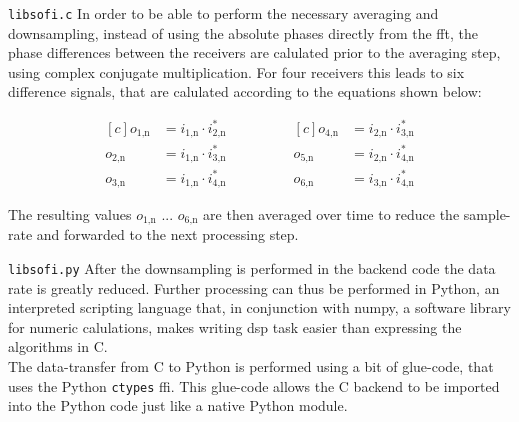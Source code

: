 \begin{subchapter}{\texttt{libsofi.c}}
  In order to be able to perform the necessary averaging
  and downsampling, instead of using the absolute phases
  directly from the \gls{fft}, the phase differences between the receivers
  are calulated prior to the averaging step, using complex conjugate multiplication.
  For four receivers this leads to six difference signals,
  that are calulated according to the equations shown below:

  \begin{equation*}
    \begin{aligned}[c]
      o_\text{1,n}&= i_\text{1,n} \cdot i_\text{2,n}^{\ast} \\
      o_\text{2,n}&= i_\text{1,n} \cdot i_\text{3,n}^{\ast} \\
      o_\text{3,n}&= i_\text{1,n} \cdot i_\text{4,n}^{\ast}
    \end{aligned}
    \qquad \qquad
    \begin{aligned}[c]
      o_\text{4,n}&= i_\text{2,n} \cdot i_\text{3,n}^{\ast} \\
      o_\text{5,n}&= i_\text{2,n} \cdot i_\text{4,n}^{\ast} \\
      o_\text{6,n}&= i_\text{3,n} \cdot i_\text{4,n}^{\ast}
    \end{aligned}
  \end{equation*}

  The resulting values $o_\text{1,n}$ ... $o_\text{6,n}$
  are then averaged over time to reduce the sample-rate
  and forwarded to the next processing step.
\end{subchapter}

\begin{subchapter}{\texttt{libsofi.py}}
  After the downsampling is performed in the backend code
  the data rate is greatly reduced. Further processing
  can thus be performed in Python, an interpreted scripting
  language that, in conjunction with numpy, a software library for
  numeric calulations, makes writing \acrshort{dsp} task easier
  than expressing the algorithms in C. \\

  The data-transfer from C to Python is performed using
  a bit of glue-code, that uses the Python \texttt{ctypes}
  \gls{ffi}.
  This glue-code allows the C backend to be imported
  into the Python code just like a native Python module.
\end{subchapter}

